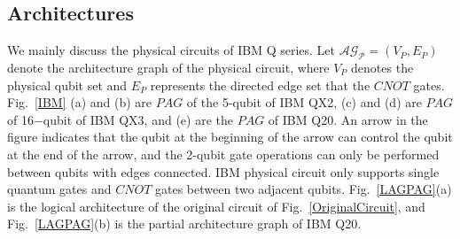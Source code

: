 \documentclass[runningheads]{llncs}
\begin{document}
\subsection{Architectures}
We mainly discuss the physical circuits of IBM Q series.
Let $\mathcal{\mathcal{AG}_{P}}=(V_{P}, E_{P})$ denote the architecture graph of the physical circuit,
where $V_{P}$ denotes the physical qubit set and $E_{P}$ represents the directed edge set that the $CNOT$ gates.
Fig.~\ref{IBM} (a) and (b) are $PAG$ of the 5-qubit of IBM QX2,
(c) and (d) are $PAG$ of 16$-$qubit of IBM QX3,
and (e) are the $PAG$ of IBM Q20.
An arrow in the figure indicates that the qubit at the beginning of the arrow can control the qubit at the end of the arrow,
and the 2-qubit gate operations can only be performed between qubits with edges connected.
IBM physical circuit only supports single quantum gates and $CNOT$ gates between two adjacent qubits.
Fig.~\ref{LAGPAG}(a) is the logical architecture of the original circuit of Fig.~\ref{OriginalCircuit},
and Fig.~\ref{LAGPAG}(b) is the partial architecture graph of IBM Q20. 
\end{document}
